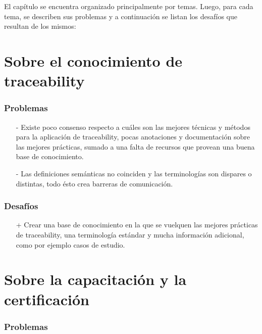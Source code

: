\documentclass[a4paper,12pt,oneside]{book}
\begin{document}
El capítulo se encuentra organizado principalmente por temas. Luego, para cada tema, se describen sus problemas y a continuación se listan los desafíos que resultan de los mismos:

\section{Sobre el conocimiento de traceability}

\subsubsection{Problemas}

\begin{itemize}

\item[-]    Existe poco consenso respecto a cuáles son las mejores técnicas y métodos para la aplicación de traceability, pocas anotaciones y documentación sobre las mejores prácticas, sumado a una falta de recursos que provean una buena base de conocimiento.

\item[-]    Las definiciones semánticas no coinciden y las terminologías son dispares o distintas, todo ésto crea barreras de comunicación.

\end{itemize}

\subsubsection{Desafíos}

\begin{itemize}

\item[+] Crear una base de conocimiento en la que se vuelquen las mejores prácticas de traceability, una terminología estándar y mucha información adicional, como por ejemplo casos de estudio.

\end{itemize}

\section{Sobre la capacitación y la certificación}

\subsubsection{Problemas}
\end{document}
